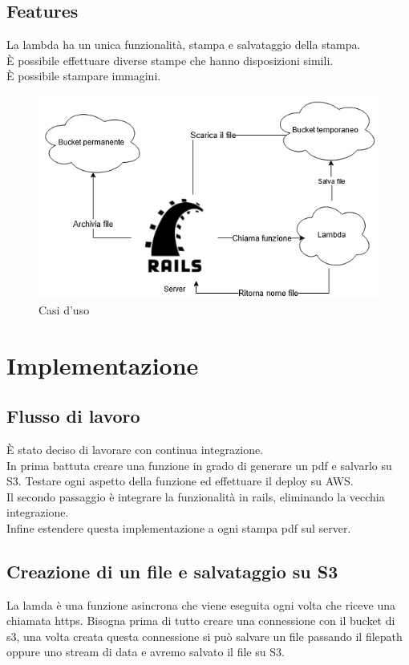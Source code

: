 \documentclass[12pt]{article}
\begin{document}
\subsection{Features}
La lambda ha un unica funzionalità, stampa e salvataggio della stampa.
\\ È possibile effettuare diverse stampe che hanno disposizioni simili.
\\ È possibile stampare immagini. 

\begin{figure}[H]
\includegraphics[scale = 0.6]{useCases.png}
\caption{Casi d'uso}
\label{fig:mesh2}
\end{figure}



\section{Implementazione}
\subsection{Flusso di lavoro}
È stato deciso di lavorare con continua integrazione. 
\\ In prima battuta creare una funzione in grado di generare un pdf e salvarlo 
su S3. Testare ogni aspetto della funzione ed effettuare il deploy su AWS. 
\\ Il secondo passaggio è integrare la funzionalità in rails, eliminando la vecchia 
integrazione. 
\\ Infine estendere questa implementazione a ogni stampa pdf sul server.

\subsection{Creazione di un file e salvataggio su S3}
La lamda è una funzione asincrona che viene eseguita ogni volta che riceve una
chiamata https. Bisogna prima di tutto creare una connessione con il bucket di s3,
una volta creata questa connessione si può salvare un file passando il filepath
oppure uno stream di data e avremo salvato il file su S3.
\end{document}
